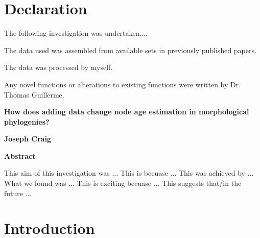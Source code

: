 \documentclass[11pt,letterpaper]{article}
\begin{document}
\newpage

\section*{Declaration}

The following investigation was undertaken....

The data used was assembled from available sets in previously published papers.

The data was processed by myself.

Any novel functions or alterations to existing functions were written by Dr. Thomas Guillerme.


\newpage

\setcounter{page}{1}
\thispagestyle{plain}
\begin{center}
	\large
	\textbf{How does adding data change node age estimation in morphological phylogenies?}

	\vspace{0.4cm}
	\textbf{Joseph Craig}

	\vspace{0.9cm}
	\textbf{Abstract}
\end{center}

This aim of this investigation was ...
This is becuase ...
This was achieved by ...
What we found was ... 
This is exciting becuase ...
This suggests that/in the future ...

\newpage

\tableofcontents

\newpage

\section{Introduction}

\end{document}
